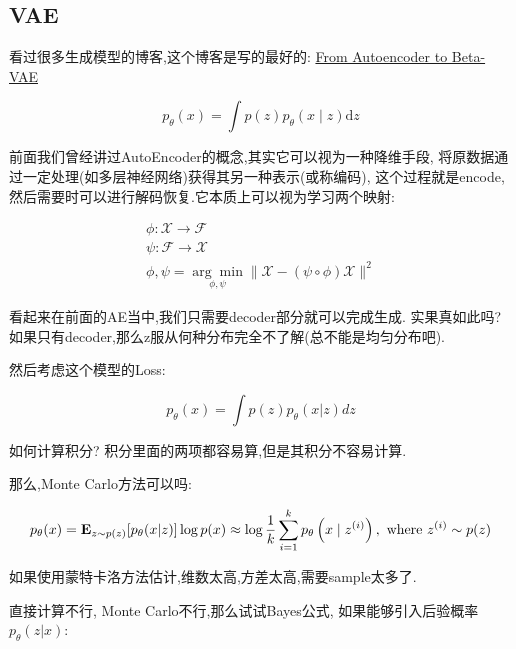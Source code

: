 	\subsection{VAE}

	看过很多生成模型的博客,这个博客是写的最好的:
	\href{https://lilianweng.github.io/posts/2018-08-12-vae/}
	{From Autoencoder to Beta-VAE}
	
	\begin{equation}
		p_{\theta}(x)=\int p(z) p_{\theta}(x \mid z) \mathrm{d}z
	\end{equation} 
	
	前面我们曾经讲过AutoEncoder的概念,其实它可以视为一种降维手段,
	将原数据通过一定处理(如多层神经网络)获得其另一种表示(或称编码),
	这个过程就是encode,然后需要时可以进行解码恢复.它本质上可以视为学习两个映射:

	\begin{equation}
		\begin{array}{l}
			\phi: \mathcal{X} \rightarrow \mathcal{F} \\
			\psi: \mathcal{F} \rightarrow \mathcal{X} \\
			\phi, \psi=\underset{\phi, \psi}{\arg \min }\|\mathcal{X}-(\psi \circ \phi) \mathcal{X}\|^{2}
		\end{array}
	\end{equation}

	看起来在前面的AE当中,我们只需要decoder部分就可以完成生成.
	实果真如此吗?如果只有decoder,那么z服从何种分布完全不了解(总不能是均匀分布吧).

	然后考虑这个模型的Loss:

	\begin{equation}
		p_\theta(x)=\int p(z)p_\theta(x|z)dz
	\end{equation}

	如何计算积分?
	积分里面的两项都容易算,但是其积分不容易计算.
	
	那么,Monte Carlo方法可以吗:
	
	\begin{equation}
		p_\theta(x)=\mathbf{E}_{z\sim p(z)}[p_\theta(x|z)]\\
		\log p(x) \approx \log \frac{1}{k} \sum_{i=1}^{k} p_{\theta}\left(x \mid z^{(i)}\right), \text { where } z^{(i)} \sim p(z)
	\end{equation}
	
	如果使用蒙特卡洛方法估计,维数太高,方差太高,需要sample太多了.

	直接计算不行, Monte Carlo不行,那么试试Bayes公式,
	如果能够引入后验概率$p_{\theta}(z|x)$:

